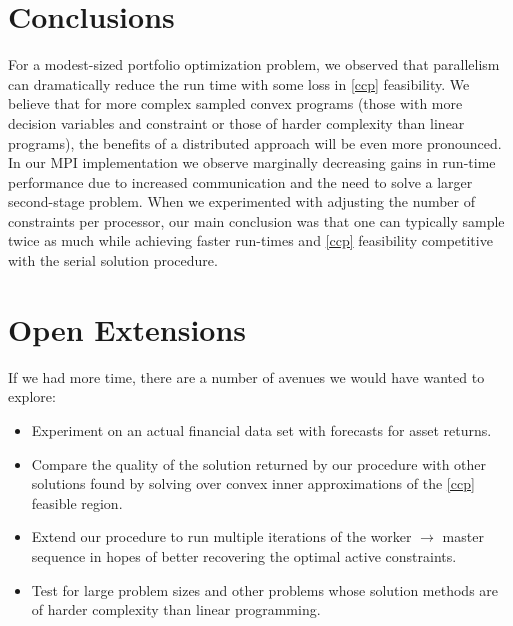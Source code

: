 \documentclass[12pt]{article}
\begin{document}
\section*{Conclusions}
For a modest-sized portfolio optimization problem, we observed that parallelism can dramatically reduce the run time with some loss in \ref{ccp} feasibility.
We believe that for more complex sampled convex programs (those with more decision variables and constraint or those of harder complexity than linear programs), the benefits of a distributed approach will be even more pronounced.
In our MPI implementation we observe marginally decreasing gains in run-time performance due to increased communication and the need to solve a larger second-stage problem.
When we experimented with adjusting the number of constraints per processor, our main conclusion was that one can typically sample twice as much while achieving faster run-times and \ref{ccp} feasibility competitive with the serial solution procedure.


\section*{Open Extensions}
If we had more time, there are a number of avenues we would have wanted to explore:
\begin{itemize}
\item Experiment on an actual financial data set with forecasts for asset returns.
\item Compare the quality of the solution returned by our procedure with other solutions found by solving over convex inner approximations of the \ref{ccp} feasible region.
\item Extend our procedure to run multiple iterations of the worker $\to$ master sequence in hopes of better recovering the optimal active constraints.
\item Test for large problem sizes and other problems whose solution methods are of harder complexity than linear programming.
\end{itemize}
\end{document}
